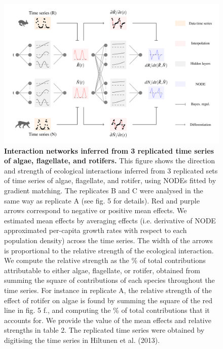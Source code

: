 \documentclass[11pt, oneside]{article}
\begin{document}
\newpage
\begin{figure}[H]
\includegraphics[width=1\linewidth,page=6]{figures/main.pdf}
\caption{
    \textbf{Interaction networks inferred from 3 replicated time series of algae, flagellate, and rotifers.}
    This figure shows the direction and strength of ecological interactions inferred from 3 replicated sets of time series of algae, flagellate, and rotifer, using NODEs fitted by gradient matching.
    The replicates B and C were analysed in the same way as replicate A (see fig. 5 for details).
    Red and purple arrows correspond to negative or positive mean effects. 
    We estimated mean effects by averaging effects (i.e. derivative of NODE approximated per-capita growth rates with respect to each population density) across the time series.
    The width of the arrows is proportional to the relative strength of the ecological interaction. 
    We compute the relative strength as the \% of total contributions attributable to either algae, flagellate, or rotifer, obtained from summing the square of contributions of each species throughout the time series.
    For instance in replicate A, the relative strength of the effect of rotifer on algae is found by summing the square of the red line in fig. 5 f., and computing the \% of total contributions that it accounts for.
    We provide the value of the mean effects and relative strengths in table 2.
    The replicated time series were obtained by digitising the time series in Hiltunen et al. (2013).
}
\end{figure}
\newpage
\end{document}
